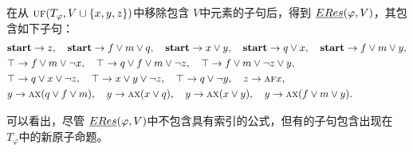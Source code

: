 \documentclass[9pt, CJK]{beamer}
\begin{document}
\begin{frame}
{{\begin{example}
			在从 $\textsc{uf}(T_\varphi, V\cup \{x,y,z\})$中移除包含 $V$中元素的子句后，得到 $\emph{ERes}(\varphi,V)$，其包含如下子句：
			\begin{align*}%
				&\start\rto z, \quad \start \rto f\vee m \vee q, \quad  \start \rto x \vee y, \quad \start \rto q \vee x, \quad	\start \rto f\vee m \vee y, \\
				& \top \rto f \vee m \vee \neg x, \quad		\top \rto q \vee f \vee m\vee \neg z,
				\quad  	\top \rto f \vee m \vee \neg z \vee y,\\
				& \top \rto q \vee x\vee \neg z, \quad 	\top \rto x \vee y \vee \neg z, \quad 	\top \rto q\vee\neg y , \quad z \rto \ALL \FUTURE x, \\
				& y \rto \ALL\NEXT(q \vee f\vee m), \quad  y \rto \ALL\NEXT(x\vee q), \quad y \rto \ALL \NEXT(x\vee y),\quad 	y \rto \ALL\NEXT(f\vee m\vee y).
			\end{align*}
			
			可以看出，尽管 $\emph{ERes}(\varphi,V)$中不包含具有索引的公式，但有的子句包含出现在 $T_\varphi$中的新原子命题。
		\end{example}
	}
	}
\end{frame}
\end{document}

